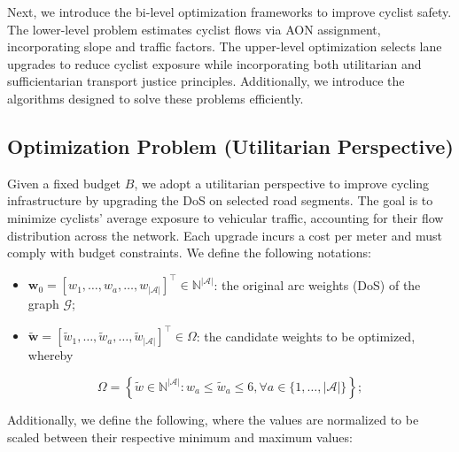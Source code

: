 \documentclass[letterpaper, 10 pt, conference]{ieeeconf}  %
\begin{document}
Next, we introduce the bi-level optimization frameworks to improve cyclist safety. The lower-level problem estimates cyclist flows via AON assignment, incorporating slope and traffic factors. The upper-level optimization selects lane upgrades to reduce cyclist exposure while incorporating both utilitarian and sufficientarian transport justice principles. Additionally, we introduce the algorithms designed to solve these problems efficiently.



\subsection{Optimization Problem (Utilitarian Perspective)}
\label{optimization_problem}

Given a fixed budget $B$, we adopt a utilitarian perspective to improve cycling infrastructure by upgrading the DoS on selected road segments. The goal is to minimize cyclists’ average exposure to vehicular traffic, accounting for their flow distribution across the network. Each upgrade incurs a cost per meter and must comply with budget constraints. We define the following notations:


\begin{itemize}
    \item $\mathbf{w}_{0} = \left [ w_{1}, \ldots, w_{a}, \ldots, w_{|\mathcal{A}|} \right ]^\top \in \mathbb{N}^{|\mathcal{A}|}$: the original arc weights (DoS) of the graph $\mathcal{G}$;
    \item $\tilde{\mathbf{w}} = \left [ \tilde{w}_{1}, \ldots, \tilde{w}_{a}, \ldots, \tilde{w}_{|\mathcal{A}|} \right ]^\top \in \Omega$: the candidate weights to be optimized, whereby
\end{itemize}

\begin{equation}
\Omega = \left \{ \tilde{w} \in \mathbb{N}^{|\mathcal{A}|} \colon w_{a} \leq \tilde{w}_{a} \leq 6,  \forall a \in \{1, \ldots, |\mathcal{A}| \} \right\};    
\end{equation}

Additionally, we define the following, where the values are normalized to be scaled between their respective minimum and maximum values:
\end{document}
